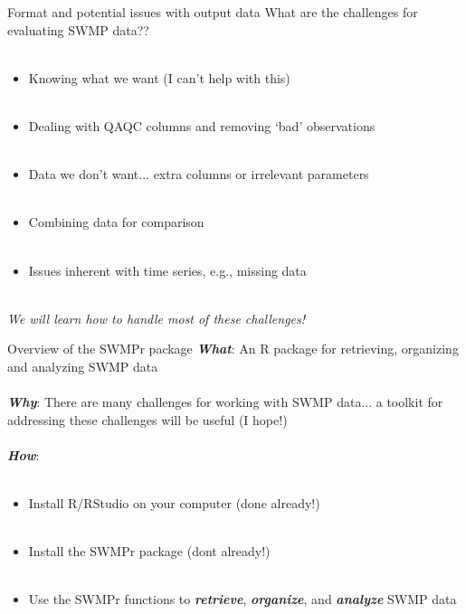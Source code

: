 \documentclass[xcolor=svgnames]{beamer}\usepackage[]{graphicx}\usepackage[]{color}
\newcommand{\Bigtxt}[1]{\textbf{\textit{#1}}}
\begin{document}
\begin{frame}{Format and potential issues with output data}
\onslide<+->
What are the challenges for evaluating SWMP data?? \\~\\
\onslide<+->
\begin{itemize}
\item Knowing what we want (I can't help with this) \\~\\
\onslide<+->
\item Dealing with QAQC columns and removing `bad' observations \\~\\
\onslide<+->
\item Data we don't want... extra columns or irrelevant parameters \\~\\
\onslide<+->
\item Combining data for comparison\\~\\
\onslide<+-> 
\item Issues inherent with time series, e.g., missing data \\~\\
\end{itemize}
\onslide<+->
\centerline{\emph{We will learn how to handle most of these challenges!}}
\end{frame}

\begin{frame}{Overview of the SWMPr package}
\onslide<+->
\textbf{\emph{What}}: An R package for retrieving, organizing and analyzing SWMP data \\~\\
\onslide<+->
\Bigtxt{Why}: There are many challenges for working with SWMP data... a toolkit for addressing these challenges will be useful (I hope!) \\~\\
\onslide<+->
\Bigtxt{How}: \\~\\
\begin{itemize}
\item Install R/RStudio on your computer (done already!) \\~\\
\item Install the SWMPr package (dont already!) \\~\\
\item Use the SWMPr functions to \Bigtxt{retrieve}, \Bigtxt{organize}, and \Bigtxt{analyze} SWMP data 
\end{itemize}
\end{frame}
\end{document}
